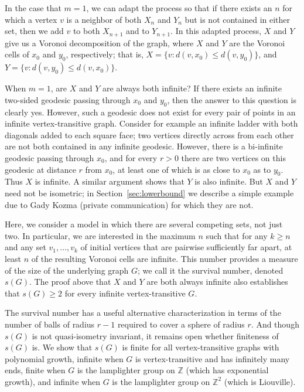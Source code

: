 \documentclass[11pt]{article}
\newcommand{\Z}{\mathbb{Z}}
\begin{document}
In the case that $m=1$, we can adapt the process so that if there exists an $n$ for which a vertex $v$ is a neighbor of both $X_n$ and $Y_n$ but is not contained in either set, then we add $v$ to both $X_{n+1}$ and to $Y_{n+1}$. In this adapted process, $X$ and $Y$ give us a Voronoi decomposition of the graph, where $X$ and $Y$ are the Voronoi cells of $x_0$ and $y_0$, respectively; that is, $X = \{v:d(v,x_0) \leq d(v,y_0)\}$, and $Y = \{v:d(v,y_0) \leq d(v,x_0)\}$. %

When $m=1$, are $X$ and $Y$ are always both infinite? If there exists an infinite two-sided geodesic passing through $x_0$ and $y_0$, then the answer to this question is clearly yes. However, such a geodesic does not exist for every pair of points in an infinite vertex-transitive graph. Consider for example an infinite ladder with both diagonals added to each square face; two vertices directly across from each other are not both contained in any infinite geodesic. However, there is a bi-infinite geodesic passing through $x_0$, and for every $r>0$ there are two vertices on this geodesic at distance $r$ from $x_0$, at least one of which is as close to $x_0$ as to $y_0$. Thus $X$ is infinite. A similar argument shows that $Y$ is also infinite. But $X$ and $Y$ need not be isometric; in Section~\ref{sec:lowerbound} we describe a simple example due to Gady Kozma (private communication) for which they are not.

Here, we consider a model in which there are several competing sets, not just two. In particular, we are interested in the maximum $n$ such that for any $k\geq n$ and any set $v_1, \ldots , v_k$ of initial vertices that are pairwise sufficiently far apart, at least $n$ of the resulting Voronoi cells are infinite. This number provides a measure of the size of the underlying graph $G$; we call it the survival number, denoted $s(G)$. The proof above that $X$ and $Y$ are both always infinite also establishes that $s(G) \geq 2$ for every infinite vertex-transitive $G$.

The survival number has a useful alternative characterization in terms of the number of balls of radius $r-1$ required to cover a sphere of radius $r$. And though $s(G)$ is not quasi-isometry invariant, it remains open whether finiteness of $s(G)$ is. We show that $s(G)$ is finite for all vertex-transitive graphs with polynomial growth, infinite when $G$ is vertex-transitive and has infinitely many ends, finite when $G$ is the lamplighter group on $\Z$ (which has exponential growth), and infinite when $G$ is the lamplighter group on $\Z^2$ (which is Liouville). 
\end{document}
